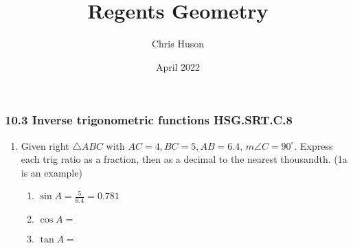 \documentclass[12pt, twoside]{article}
\title{Regents Geometry}
\author{Chris Huson}
\date{April 2022}
\begin{document}
\subsubsection*{10.3 Inverse trigonometric functions \hfill HSG.SRT.C.8}
\begin{enumerate}
\item Given right $\triangle ABC$ with $AC=4, BC=5, AB=6.4$, $m\angle C=90^\circ$. Express each trig ratio as a fraction, then as a decimal to the nearest thousandth. (1a is an example)
  \begin{multicols}{2}
    \begin{enumerate}[itemsep=0.2cm]
      \item $\displaystyle \sin A = \frac{5}{6.4} = 0.781$
      \item $\cos A =$
      \item $\tan A =$
    \end{enumerate}
    \begin{center}
    \end{center}
  \end{multicols} \vspace{1cm}


\end{enumerate}
\end{document}
